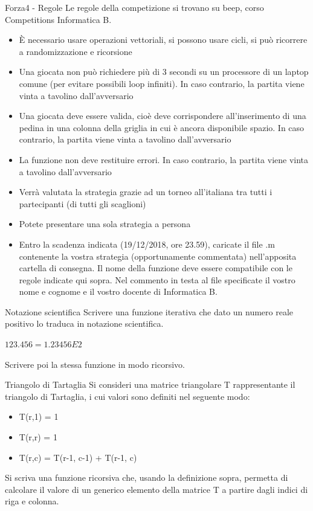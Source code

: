 \documentclass[format=169, handout]{beamer}
\begin{document}
\begin{frame}[allowframebreaks]{Forza4 - Regole}
Le regole della competizione si trovano su beep, corso Competitions Informatica B.

\begin{itemize}
\item È necessario usare operazioni vettoriali, si possono usare cicli, si può ricorrere a randomizzazione e ricorsione 
\item Una giocata non può richiedere più di 3 secondi su un processore di un laptop comune (per evitare possibili loop infiniti). In caso contrario, la partita viene vinta a tavolino dall'avversario 
\item Una giocata deve essere valida, cioè deve corrispondere all'inserimento di una pedina in una colonna della griglia in cui è ancora disponibile spazio. In caso contrario, la partita viene vinta a tavolino dall'avversario 
\item La funzione non deve restituire errori. In caso contrario, la partita viene vinta a tavolino dall'avversario 
\item Verrà valutata la strategia grazie ad un torneo all'italiana tra tutti i partecipanti (di tutti gli scaglioni)
\item Potete presentare una sola strategia a persona 
\item Entro la scadenza indicata (19/12/2018, ore 23.59), caricate il file .m contenente la vostra strategia (opportunamente commentata) nell'apposita cartella di consegna. Il nome della funzione deve essere compatibile con le regole indicate qui sopra. Nel commento in testa al file specificate il vostro nome e cognome e il vostro docente di Informatica B.  
\end{itemize}
\end{frame}

\begin{frame}{Notazione scientifica}
	Scrivere una funzione iterativa che dato un numero reale positivo lo traduca in notazione scientifica.
	
	$123.456 = 1.23456E2$
	
	Scrivere poi la stessa funzione in modo ricorsivo.
\end{frame}

\begin{frame}{Triangolo di Tartaglia}
	Si consideri una matrice triangolare T rappresentante il triangolo di Tartaglia, i cui valori sono definiti nel seguente modo:
	\begin{itemize}
		\item T(r,1) = 1
		\item T(r,r) = 1
		\item T(r,c) = T(r-1, c-1) + T(r-1, c)
	\end{itemize}

	Si scriva una funzione ricorsiva che, usando la definizione sopra, permetta di calcolare il valore di un generico elemento della matrice T a partire dagli indici di riga e colonna.
\end{frame}
\end{document}
